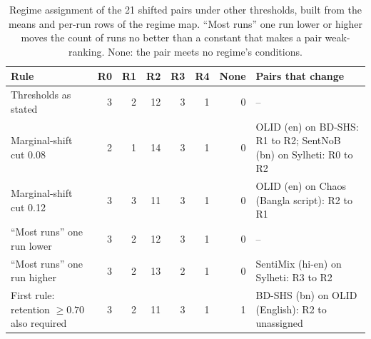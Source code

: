 \begin{table}[t]
\centering
\small
\setlength{\tabcolsep}{4pt}
\caption{Regime assignment of the 21 shifted pairs under other thresholds, built from the means and per-run rows of the regime map. ``Most runs'' one run lower or higher moves the count of runs no better than a constant that makes a pair weak-ranking. None: the pair meets no regime's conditions.}
\label{tab:regime-threshold-sensitivity}
\begin{tabular}{lrrrrrrp{4.1cm}}
\toprule
Rule & R0 & R1 & R2 & R3 & R4 & None & Pairs that change \\
\midrule
Thresholds as stated & 3 & 2 & 12 & 3 & 1 & 0 & -- \\
Marginal-shift cut 0.08 & 2 & 1 & 14 & 3 & 1 & 0 & OLID (en) on BD-SHS: R1 to R2; SentNoB (bn) on Sylheti: R0 to R2 \\
Marginal-shift cut 0.12 & 3 & 3 & 11 & 3 & 1 & 0 & OLID (en) on Chaos (Bangla script): R2 to R1 \\
``Most runs'' one run lower & 3 & 2 & 12 & 3 & 1 & 0 & -- \\
``Most runs'' one run higher & 3 & 2 & 13 & 2 & 1 & 0 & SentiMix (hi-en) on Sylheti: R3 to R2 \\
First rule: retention $\ge 0.70$ also required & 3 & 2 & 11 & 3 & 1 & 1 & BD-SHS (bn) on OLID (English): R2 to unassigned \\
\bottomrule
\end{tabular}
\end{table}
